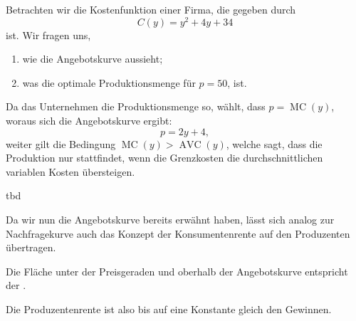 \begin{example}
	Betrachten wir die Kostenfunktion einer Firma, die gegeben durch
	\[
		C(y) = y^2 + 4y + 34
	\]
	ist. Wir fragen uns,
	\begin{enumerate}
		\item wie die Angebotskurve aussieht;
		\item was die optimale Produktionsmenge für $p=50$, ist.
	\end{enumerate}
	Da das Unternehmen die Produktionsmenge so, wählt, dass $p = \operatorname{MC}(y)$, woraus sich die Angebotskurve ergibt:
	\[
		p = 2y + 4
		,\]
	weiter gilt die Bedingung $\operatorname{MC}(y) > \operatorname{AVC}(y)$, welche sagt, dass die Produktion nur stattfindet, wenn
	die Grenzkosten die durchschnittlichen variablen Kosten übersteigen.

	\begin{center}
		tbd
	\end{center}
\end{example}


Da wir nun die Angebotskurve bereits erwähnt haben, lässt sich analog zur Nachfragekurve auch das Konzept der Konsumentenrente auf den Produzenten übertragen.

\begin{definition} 
	Die Fläche unter der Preisgeraden und oberhalb der Angebotskurve
	entspricht der .
\end{definition}

\begin{remark}
	Die Produzentenrente ist also bis auf eine Konstante gleich den
	Gewinnen.
\end{remark}

